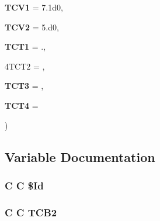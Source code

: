 {{$$\begin{DoxyParamCaption}
\item[{{\bf T\-C\-V1}}]{ = {\ttfamily 7.1d0}, }
\item[{{\bf T\-C\-V2}}]{ = {\ttfamily 5.d0}, }
\item[{{\bf T\-C\-T1}}]{ = {.}, }
\item[{4\-T\-C\-T2}]{ = {}, }
\item[{{\bf T\-C\-T3}}]{ = {}, }
\item[{{\bf T\-C\-T4}}]{ = {}}
\end{DoxyParamCaption}
)}}\label{msa20_2home_2abonfi_2_c_f_d__codes_2_eul_f_s_83_82_83_2include_2turb_8com_a389bbfe938bae9bde27ca4e66428f7d1}


\subsection{Variable Documentation}
\hypertarget{msa20_2home_2abonfi_2_c_f_d__codes_2_eul_f_s_83_82_83_2include_2turb_8com_af40bd3a96fc1553c00422342f92046b8}{
\subsubsection[{\$\-Id}]{\setlength{\rightskip}{0pt plus 5cm}C C \$Id}}\label{msa20_2home_2abonfi_2_c_f_d__codes_2_eul_f_s_83_82_83_2include_2turb_8com_af40bd3a96fc1553c00422342f92046b8}
\hypertarget{msa20_2home_2abonfi_2_c_f_d__codes_2_eul_f_s_83_82_83_2include_2turb_8com_aa029a08b7d96afae971ad6b66644fc47}{
\subsubsection[{T\-C\-B2}]{\setlength{\rightskip}{0pt plus 5cm}C C T\-C\-B2}}\label{msa20_2home_2abonfi_2_c_f_d__codes_2_eul_f_s_83_82_83_2include_2turb_8com_aa029a08b7d96afae971ad6b66644fc47}
